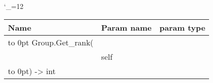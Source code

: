 \begingroup \catcode`\_=12 \tt
\begin{tabular}{lll}
\toprule
\textrm{Name}&\textrm{Param name}&\textrm{param type}\\
\midrule
\hbox to 0pt {Group.Get_rank(\hss}\\
& self\\
\hbox to 0pt{) -> int\hss}\\
\bottomrule
\end{tabular}
\endgroup
